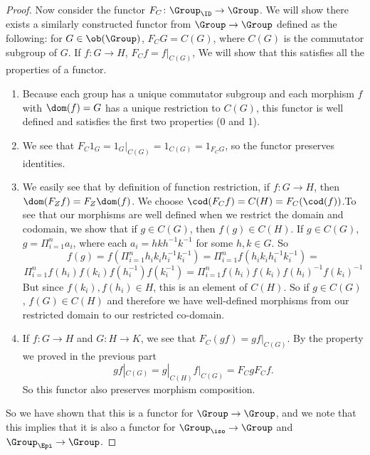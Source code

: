 \documentclass[main.tex]{subfiles}
\begin{document}
\begin{proof}
Now consider the functor $F_C\colon  \Group_{\ID} \rightarrow \Group$. We will show there exists a similarly constructed functor from $\Group \rightarrow \Group$ defined as the following: for $G \in \ob(\Group)$, $F_CG = C(G)$, where $ C(G) $ is the commutator subgroup of $G$. If $f \colon G \rightarrow H$, $F_Cf = f|_{C(G)}$, We will show that this satisfies all the properties of a functor.
\begin{enumerate}
    \item Because each group has a unique commutator subgroup and each morphism $f$ with $\dom(f) = G$ has a unique restriction to $C(G)$, this functor is well defined and satisfies the first two properties (0 and 1).
    \item We see that $F_{C} 1_{G} = 1_{G}|_{C(G)} = 1_{C(G)} = 1_{F_{C}G}$, so the functor preserves identities. 
    \item We easily see that by definition of function restriction, if $f\colon G \rightarrow H$, then $\dom(F_{Z}f) = F_{Z}\dom(f)$. We choose $\cod(F_{C}f) = C(H) = F_C(\cod(f))$.To see that our morphisms are well defined when we restrict the domain and codomain, we show that if $g \in C(G)$, then $f(g) \in C(H)$. If $g \in C(G)$, $g = \Pi_{i = 1}^{n} a_i$, where each $a_i = hkh^{-1}k^{-1}$ for some $h,k \in G$. So $$f(g) = f(\Pi_{i = 1}^{n} h_ik_ih_i^{-1}k_i^{-1}) = \Pi_{i = 1}^{n} f(h_ik_ih_i^{-1}k_i^{-1}) =$$ $$  \Pi_{i = 1}^{n} f(h_i)f(k_i)f(h_i^{-1})f(k_i^{-1}) = \Pi_{i = 1}^{n} f(h_i)f(k_i)f(h_i)^{-1}f(k_i)^{-1}$$ But since $f(k_i), f(h_i) \in H$, this is an element of $C(H)$. So if $g \in C(G)$, $f(G) \in C(H)$ and therefore we have well-defined morphisms from our restricted domain to our restricted co-domain. 
    \item If $f\colon G \rightarrow H$ and $G\colon H \rightarrow K$, we see that $F_C(gf) = gf|_{C(G)}$. By the property we proved in the previous part \[gf|_{C(G)} = g|_{C(H)}f|_{C(G)} = F_CgF_Cf.\] So this functor also preserves morphism composition.
\end{enumerate}

So we have shown that this is a functor for $\Group \rightarrow \Group$, and we note that this implies that it is also a functor for $\Group_{\iso} \rightarrow \Group$ and $\Group _{\Epi} \rightarrow \Group$. 


\end{proof}
\end{document}
